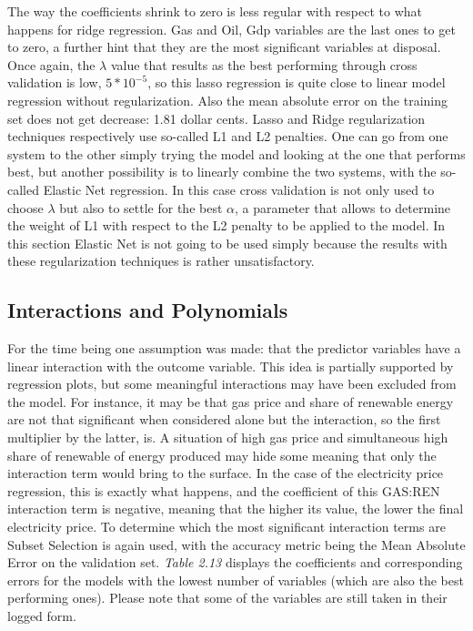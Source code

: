 \documentclass{book}
\begin{document}
The way the coefficients shrink to zero is less regular with respect to what happens for ridge regression. Gas and Oil, Gdp variables are the last ones to get to zero, a further hint that they are the most significant variables at disposal. Once again, the $\lambda$ value that results as the best performing through cross validation is low, $5*10^{-5}$, so this lasso regression is quite close to linear model regression without regularization. Also the mean absolute error on the training set does not get decrease: 1.81 dollar cents. Lasso and Ridge regularization techniques respectively use so-called L1 and L2 penalties. One can go from one system to the other simply trying the model and looking at the one that performs best, but another possibility is to linearly combine the two systems, with the so-called Elastic Net regression. In this case cross validation is not only used to choose $\lambda$ but also to settle for the best $\alpha$, a parameter that allows to determine the weight of L1 with respect to the L2 penalty to be applied to the model. In this section Elastic Net is not going to be used simply because the results with these regularization techniques is rather unsatisfactory.

\subsection{Interactions and Polynomials}

For the time being one assumption was made: that the predictor variables have a linear interaction with the outcome variable. This idea is partially supported by regression plots, but some meaningful interactions may have been excluded from the model. For instance, it may be that gas price and share of renewable energy are not that significant when considered alone but the interaction, so the first multiplier by the latter, is. A situation of high gas price and simultaneous high share of renewable of energy produced may hide some meaning that only the interaction term would bring to the surface. In the case of the electricity price regression, this is exactly what happens, and the coefficient of this GAS:REN interaction term is negative, meaning that the higher its value, the lower the final electricity price. To determine which the most significant interaction terms are Subset Selection is again used, with the accuracy metric being the Mean Absolute Error on the validation set. \textit{Table 2.13} displays the coefficients and corresponding errors for the models with the lowest number of variables (which are also the best performing ones). Please note that some of the variables are still taken in their logged form.
\end{document}
